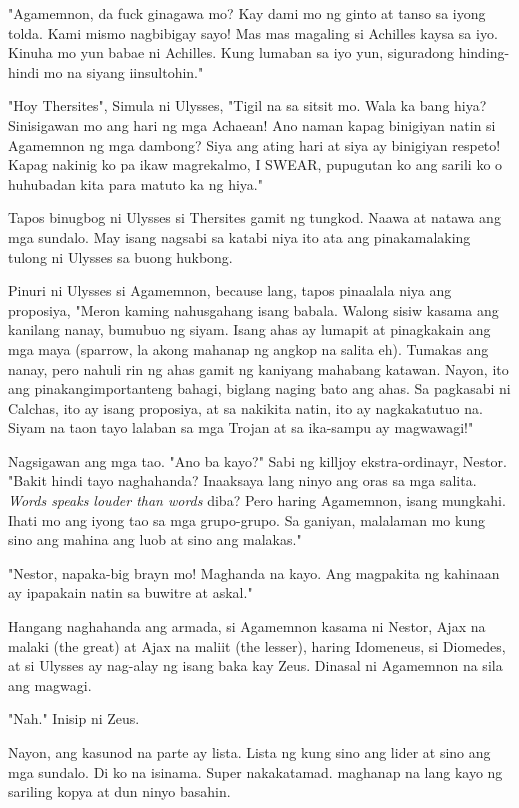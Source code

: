 \documentclass[12pt,letterpaper]{report}
\begin{document}
"Agamemnon, da fuck ginagawa mo? Kay dami mo ng ginto at tanso sa iyong tolda. Kami mismo nagbibigay sayo!
Mas mas magaling si Achilles kaysa sa iyo. Kinuha mo yun babae ni Achilles. Kung lumaban sa iyo yun,
siguradong hinding-hindi mo na siyang iinsultohin."

"Hoy Thersites", Simula ni Ulysses, "Tigil na sa sitsit mo. Wala ka bang hiya?
Sinisigawan mo ang hari ng mga Achaean! Ano naman kapag binigiyan natin si Agamemnon ng mga dambong?
Siya ang ating hari at siya ay binigiyan respeto! Kapag nakinig ko pa ikaw magrekalmo, I SWEAR,
pupugutan ko ang sarili ko o huhubadan kita para matuto ka ng hiya."

Tapos binugbog ni Ulysses si Thersites gamit ng tungkod. Naawa at natawa ang mga sundalo.
May isang nagsabi sa katabi niya ito ata ang pinakamalaking tulong ni Ulysses sa buong hukbong.

Pinuri ni Ulysses si Agamemnon, because lang, tapos pinaalala niya ang proposiya,
"Meron kaming nahusgahang isang babala. Walong sisiw kasama ang kanilang nanay, bumubuo ng siyam.
Isang ahas ay lumapit at pinagkakain ang mga maya (sparrow, la akong mahanap ng angkop na salita eh).
Tumakas ang nanay, pero nahuli rin ng ahas gamit ng kaniyang mahabang katawan. Nayon, ito ang pinakangimportanteng bahagi,
biglang naging bato ang ahas. Sa pagkasabi ni Calchas, ito ay isang proposiya, at sa nakikita natin, ito ay nagkakatutuo na.
Siyam na taon tayo lalaban sa mga Trojan at sa ika-sampu ay magwawagi!"

Nagsigawan ang mga tao. "Ano ba kayo?" Sabi ng killjoy ekstra-ordinayr, Nestor. "Bakit hindi tayo naghahanda?
Inaaksaya lang ninyo ang oras sa mga salita. \textit{Words speaks louder than words} diba? Pero haring Agamemnon, isang mungkahi.
Ihati mo ang iyong tao sa mga grupo-grupo. Sa ganiyan, malalaman mo kung sino ang mahina ang luob at sino ang malakas."

"Nestor, napaka-big brayn mo! Maghanda na kayo. Ang magpakita ng kahinaan ay ipapakain natin sa buwitre at askal."

Hangang naghahanda ang armada, si Agamemnon kasama ni Nestor, Ajax na malaki (the great) at Ajax na maliit (the lesser),
haring Idomeneus, si Diomedes, at si Ulysses ay nag-alay ng isang baka kay Zeus. Dinasal ni Agamemnon na sila ang magwagi.

"Nah." Inisip ni Zeus.

Nayon, ang kasunod na parte ay lista. Lista ng kung sino ang lider at sino ang mga sundalo. Di ko na isinama.
Super nakakatamad. maghanap na lang kayo ng sariling kopya at dun ninyo basahin.
\end{document}
